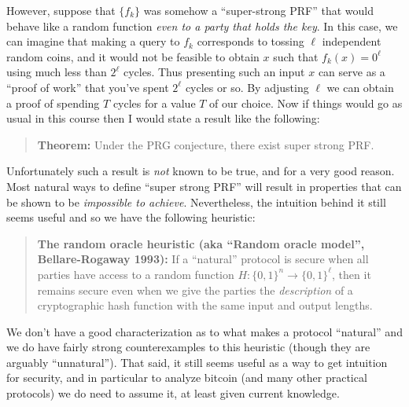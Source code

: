 However, suppose that \(\{ f_k \}\) was somehow a ``super-strong PRF''
that would behave like a random function \emph{even to a party that
holds the key}. In this case, we can imagine that making a query to
\(f_k\) corresponds to tossing \(\ell\) independent random coins, and it
would not be feasible to obtain \(x\) such that \(f_k(x)=0^\ell\) using
much less than \(2^\ell\) cycles. Thus presenting such an input \(x\)
can serve as a ``proof of work'' that you've spent \(2^\ell\) cycles or
so. By adjusting \(\ell\) we can obtain a proof of spending \(T\) cycles
for a value \(T\) of our choice. Now if things would go as usual in this
course then I would state a result like the following:

\begin{quote}
\textbf{Theorem:} Under the PRG conjecture, there exist super strong
PRF.
\end{quote}

Unfortunately such a result is \emph{not} known to be true, and for a
very good reason. Most natural ways to define ``super strong PRF'' will
result in properties that can be shown to be \emph{impossible to
achieve}. Nevertheless, the intuition behind it still seems useful and
so we have the following heuristic:

\begin{quote}
\textbf{The random oracle heuristic (aka ``Random oracle model'',
Bellare-Rogaway 1993):} If a ``natural'' protocol is secure when all
parties have access to a random function
\(H:\{0,1\}^n\rightarrow\{0,1\}^\ell\), then it remains secure even when
we give the parties the \emph{description} of a cryptographic hash
function with the same input and output lengths.
\end{quote}

We don't have a good characterization as to what makes a protocol
``natural'' and we do have fairly strong counterexamples to this
heuristic (though they are arguably ``unnatural''). That said, it still
seems useful as a way to get intuition for security, and in particular
to analyze bitcoin (and many other practical protocols) we do need to
assume it, at least given current knowledge.

\hypertarget{romcaveatrem}{}

